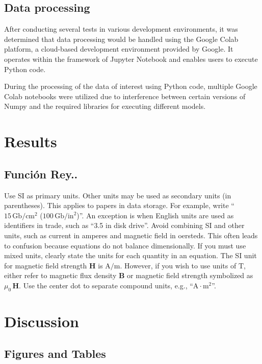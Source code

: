 \documentclass{ifacconf}
\begin{document}
\subsection{Data processing}

After conducting several tests in various development environments, it was determined that data processing would be handled using the Google Colab platform, a cloud-based development environment provided by Google. It operates within the framework of Jupyter Notebook and enables users to execute Python code.

During the processing of the data of interest using Python code, multiple Google Colab notebooks were utilized due to interference between certain versions of Numpy and the required libraries for executing different models.

\section{Results}
\subsection{Función Rey..}
Use SI as primary units. Other units may be used as secondary units
(in parentheses). This applies to papers in data storage. For example,
write ``$15\,\mathrm{Gb}/\mathrm{cm}^2$ ($100\,\mathrm{Gb}/\mathrm{in}^2$)''. 
An exception is when
English units are used as identifiers in trade, such as ``3.5 in
disk drive''. Avoid combining SI and other units, such as current in
amperes and magnetic field in oersteds. This often leads to confusion
because equations do not balance dimensionally. If you must use mixed
units, clearly state the units for each quantity in an equation.  The
SI unit for magnetic field strength $\mathbf{H}$ is $\mathrm{A}/\mathrm{m}$. However, if you wish to
use units of $\mathrm{T}$, either refer to magnetic flux density $\mathbf{B}$ or
magnetic field strength symbolized as $\mu_0\,\mathbf{H}$. Use the center dot to
separate compound units, e.g., ``$\mathrm{A} \cdot \mathrm{m}^2$''.

\section{Discussion}

\subsection{Figures and Tables}
\end{document}
